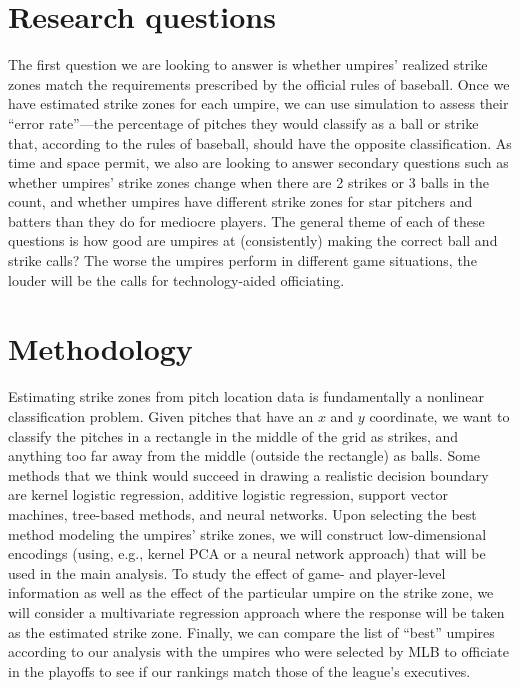 \documentclass[bj, preprint]{imsart}
\begin{document}
\section{Research questions}\label{sec:research}
The first question we are looking to answer is whether umpires' realized strike zones match the requirements prescribed by the official rules of baseball. 
Once we have estimated strike zones for each umpire, we can use simulation to assess their ``error rate''---the percentage of pitches they would classify as a ball or strike that, according to the rules of baseball, should have the opposite classification.
As time and space permit, we also are looking to answer secondary questions such as whether umpires' strike zones change when there are 2 strikes or 3 balls in the count, and whether umpires have different strike zones for star pitchers and batters than they do for mediocre players.
The general theme of each of these questions is how good are umpires at (consistently) making the correct ball and strike calls?
The worse the umpires perform in different game situations, the louder will be the calls for technology-aided officiating.
\vspace{-1.5mm}

\section{Methodology}\label{sec:method}
Estimating strike zones from pitch location data is fundamentally a nonlinear classification problem. 
Given pitches that have an $x$ and $y$ coordinate, we want to classify the pitches in a rectangle in the middle of the grid as strikes, and anything too far away from the middle (outside the rectangle) as balls.
Some methods that we think would succeed in drawing a realistic decision boundary are kernel logistic regression, additive logistic regression, support vector machines, tree-based methods, and neural networks. 
Upon selecting the best method modeling the umpires' strike zones, we will construct low-dimensional encodings (using, e.g., kernel PCA or a neural network approach) that will be used in the main analysis.
To study the effect of game- and player-level information as well as the effect of the particular umpire on the strike zone, we will consider a multivariate regression approach where the response will be taken as the estimated strike zone.
Finally, we can compare the list of ``best'' umpires according to our analysis with the umpires who were selected by MLB to officiate in the playoffs to see if our rankings match those of the league's executives.



{}
\end{document}
